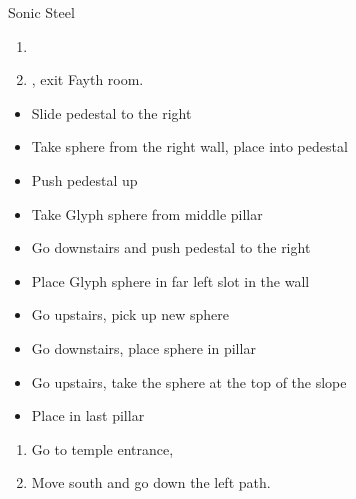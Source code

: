 \winvfill
\begin{equip}
	\begin{itemize}
		\tidusf Sonic Steel
	\end{itemize}
\end{equip}
\begin{enumerate}[resume]
	\item \formation{\rikku}{\tidus}{\yuna}
	\item \save, exit Fayth room.
\end{enumerate}
\begin{trial}
	\begin{itemize}
		\item Slide pedestal to the right
		\item Take sphere from the right wall, place into pedestal
		\item Push pedestal up
		\item Take Glyph sphere from middle pillar
		\item Go downstairs and push pedestal to the right
		\item Place Glyph sphere in far left slot in the wall
		\item Go upstairs, pick up new sphere
		\item Go downstairs, place sphere in pillar
		\item Go upstairs, take the sphere at the top of the slope
		\item Place in last pillar
	\end{itemize}
\end{trial}
\begin{enumerate}[resume]
	\item Go to temple entrance, \sd
	\item Move south and go down the left path.
\end{enumerate}
